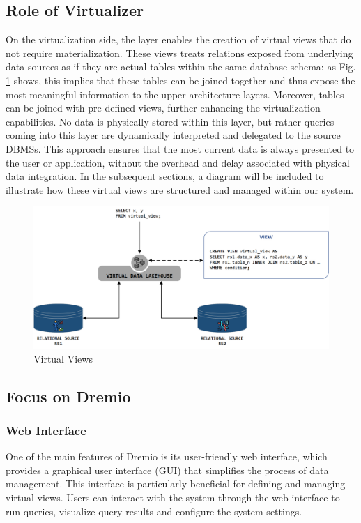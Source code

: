 \subsection{Role of Virtualizer}
On the virtualization side, the layer enables the creation of virtual views that do not require materialization. These views treats relations exposed from underlying data sources as if they are actual tables within the same database schema: as Fig. \ref{fig:virtual} shows, this implies that these tables can be joined together and thus expose the most meaningful information to the upper architecture layers. Moreover, tables can be joined with pre-defined views, further enhancing the virtualization capabilities. No data is physically stored within this layer, but rather queries coming into this layer are dynamically interpreted and delegated to the source \ac{DBMS}s. This approach ensures that the most current data is always presented to the user or application, without the overhead and delay associated with physical data integration. In the subsequent sections, a diagram will be included to illustrate how these virtual views are structured and managed within our system.
\begin{figure}[ht]
    \centering
    \includegraphics[width=15cm]{res/Drawing2.png}
    \caption{Virtual Views}
    \label{fig:virtual}
\end{figure}
\subsection{Focus on Dremio}
\subsubsection{Web Interface}
One of the main features of Dremio is its user-friendly web interface, which provides a graphical user interface (\ac{GUI}) that simplifies the process of data management. This interface is particularly beneficial for defining and managing virtual views. Users can interact with the system through the web interface to run queries, visualize query results and configure the system settings.
